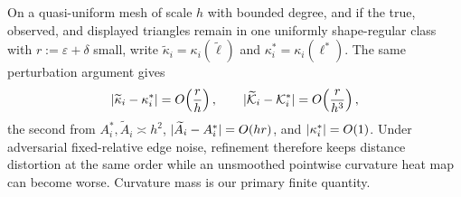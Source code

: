 On a quasi-uniform mesh of scale $h$ with bounded degree, and if the true,
observed, and displayed triangles remain in one uniformly shape-regular class
with $r:=\varepsilon+\delta$ small, write
$\widetilde\kappa_i=\kappa_i(\widetilde\ell)$ and
$\kappa_i^*=\kappa_i(\ell^*)$.  The same perturbation argument gives
\begin{equation}
 \lvert \widetilde\kappa_i-\kappa_i^*\rvert=O\!\left(\frac{r}{h}\right),
 \qquad
 \lvert \widetilde{\mathcal K}_i-\mathcal K_i^*\rvert=O\!\left(\frac{r}{h^3}\right),
 \label{eq:density-scaling}
\end{equation}
the second from $A_i^*,\widetilde A_i\asymp h^2$,
$\lvert \widetilde A_i-A_i^*\rvert=O(hr)$, and $\lvert \kappa_i^*\rvert=O(1)$.  Under
adversarial fixed-relative edge noise, refinement therefore keeps distance
distortion at the same order while an unsmoothed pointwise curvature heat map
can become worse.  Curvature mass is our primary finite quantity.
